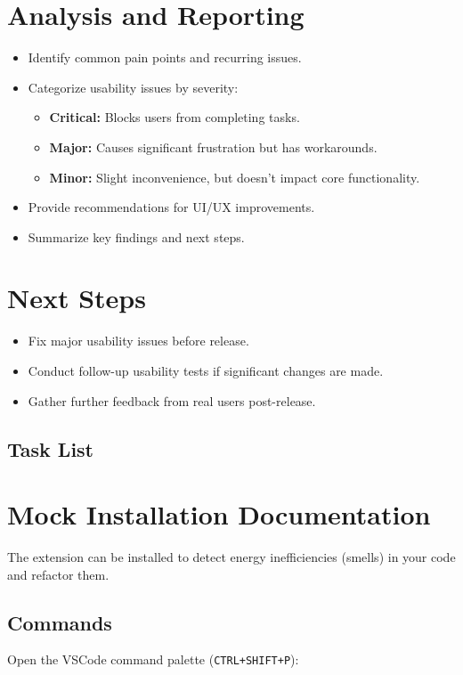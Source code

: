\documentclass[12pt, titlepage]{article}
\begin{document}
\section*{Analysis and Reporting}
\begin{itemize}
  \item Identify common pain points and recurring issues.
  \item Categorize usability issues by severity:
    \begin{itemize}
      \item \textbf{Critical:} Blocks users from completing tasks.
      \item \textbf{Major:} Causes significant frustration but has workarounds.
      \item \textbf{Minor:} Slight inconvenience, but doesn't impact
        core functionality.
    \end{itemize}
  \item Provide recommendations for UI/UX improvements.
  \item Summarize key findings and next steps.
\end{itemize}

\section*{Next Steps}
\begin{itemize}
  \item Fix major usability issues before release.
  \item Conduct follow-up usability tests if significant changes are made.
  \item Gather further feedback from real users post-release.
\end{itemize}

\subsection*{Task List}

\section*{Mock Installation Documentation}
The extension can be installed to detect energy inefficiencies
(smells) in your code and refactor them.

\subsection*{Commands}
Open the VSCode command palette (\texttt{CTRL+SHIFT+P}):
\end{document}
